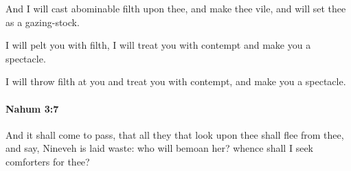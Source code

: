 			\begin{versebox}
					\item[BHS] 
					\item[LXX] 
					\item[ASV] And I will cast abominable filth upon thee, and make thee vile, and will set thee as a gazing-stock.
					\item[NIV] I will pelt you with filth, I will treat you with contempt and make you a spectacle.
					\item[NRSV] I will throw filth at you and treat you with contempt, and make you a spectacle.
			\end{versebox}

		\paragraph{Nahum 3:7} %
			\label{NAHUM-3-7}

			And it shall come to pass, that all they that look upon thee shall flee from thee, and say, Nineveh is laid waste: who will bemoan her? whence shall I seek comforters for thee?

